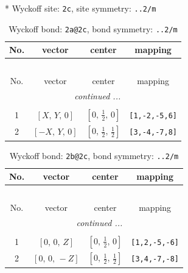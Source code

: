 \documentclass[fleqn,8pt]{jsarticle}
\begin{document}
* Wyckoff site: {\tt 2c}, site symmetry: {\tt ..2/m}
\renewcommand{\arraystretch}{1.2}
\begin{longtable}{cccc}
\caption{Wyckoff bond: {\tt 2a@2c}, bond symmetry: {\tt ..2/m}}
 \\
 \hline \hline
No. & vector & center & mapping \\ \hline \endfirsthead

\multicolumn{3}{l}{\tablename\ \thetable{}} \\
 \hline \hline
No. & vector & center & mapping \\ \hline \endhead

 \hline \hline
\multicolumn{3}{r}{\footnotesize\it continued ...} \\ \endfoot

 \hline \hline
\multicolumn{3}{r}{} \\ \endlastfoot

1 & $\left[ X,\, Y,\, 0 \right]$ & $\left[ 0,\, \frac{1}{2},\, 0 \right]$ & {\tt [1,-2,-5,6]} \\ \hline
2 & $\left[ - X,\, Y,\, 0 \right]$ & $\left[ 0,\, \frac{1}{2},\, \frac{1}{2} \right]$ & {\tt [3,-4,-7,8]} \\
\end{longtable}
\renewcommand{\arraystretch}{1.2}
\begin{longtable}{cccc}
\caption{Wyckoff bond: {\tt 2b@2c}, bond symmetry: {\tt ..2/m}}
 \\
 \hline \hline
No. & vector & center & mapping \\ \hline \endfirsthead

\multicolumn{3}{l}{\tablename\ \thetable{}} \\
 \hline \hline
No. & vector & center & mapping \\ \hline \endhead

 \hline \hline
\multicolumn{3}{r}{\footnotesize\it continued ...} \\ \endfoot

 \hline \hline
\multicolumn{3}{r}{} \\ \endlastfoot

1 & $\left[ 0,\, 0,\, Z \right]$ & $\left[ 0,\, \frac{1}{2},\, 0 \right]$ & {\tt [1,2,-5,-6]} \\ \hline
2 & $\left[ 0,\, 0,\, - Z \right]$ & $\left[ 0,\, \frac{1}{2},\, \frac{1}{2} \right]$ & {\tt [3,4,-7,-8]} \\
\end{longtable}
\renewcommand{\arraystretch}{1.2}
\end{document}
